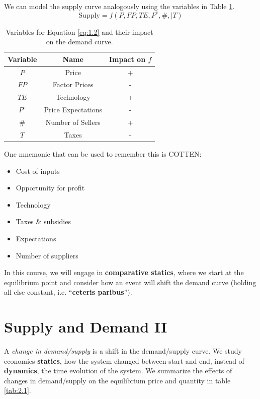 \documentclass{article}
\begin{document}
We can model the supply curve analogously using the variables in Table \ref{tab:1.2}.
\begin{equation}\label{eq:1.2}
    \textrm{Supply} = f(P,FP, TE, P^e, \#, |T)
\end{equation}

\begin{table}
    \centering
    \begin{tabular}{c|c|c}
        Variable & Name & Impact on $f$ \\
        \hline
        $P$ & Price& + \\
         $FP$& Factor Prices & - \\
         $TE$& Technology & +\\
         $P^e$&Price Expectations & -\\
         $\#$&Number of Sellers & + \\
         $T$&Taxes & -
    \end{tabular}
    \caption{Variables for Equation \ref{eq:1.2} and their impact on the demand curve.}
    \label{tab:1.2}
\end{table}
One mnemonic that can be used to remember this is COTTEN:
\begin{itemize}
	\item Cost of inputs
	\item Opportunity for profit
	\item Technology
	\item Taxes \& subsidies
	\item Expectations
	\item Number of suppliers
\end{itemize}
In this course, we will engage in \textbf{comparative statics}, where we start at the equilibrium point and consider how an event will shift the demand curve (holding all else constant, i.e. ``\textbf{ceteris paribus}'').


\section{Supply and Demand II}
A \textit{change in demand/supply} is a shift in the demand/supply curve. We study economics \textbf{statics}, how the system changed between start and end, instead of \textbf{dynamics}, the time evolution of the system.
We summarize the effects of changes in demand/supply on the equilibrium price and quantity in table \ref{tab:2.1}.
\end{document}
